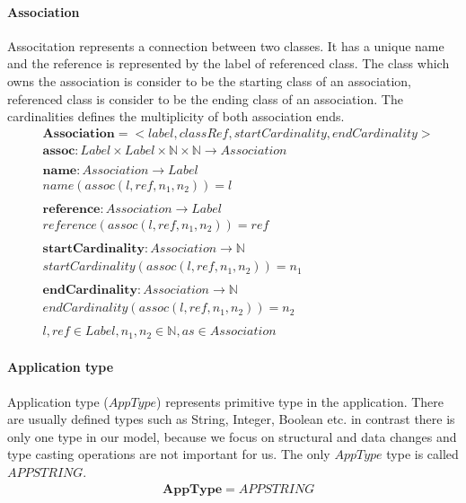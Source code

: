 \documentclass[11pt]{article}
\begin{document}
\paragraph {Association} Associtation represents a connection between two classes. It has a unique name and the reference is represented by the label of referenced class. The class which owns the association is consider to be the starting class of an association, referenced class is consider to be the ending class of an association. The cardinalities defines the multiplicity of both association ends.
\begin{align*}
&	\mathbf{Association} = <label, classRef, startCardinality, endCardinality> \\
&	\mathbf{assoc} : Label \times Label \times \mathbb{N} \times \mathbb{N} \rightarrow Association\\ \\
&	\mathbf{name} : Association \rightarrow Label \\
&	name(assoc(l, ref, n_1, n_2)) = l\\ \\
&	\mathbf{reference} : Association \rightarrow Label \\
&	reference(assoc(l, ref, n_1, n_2)) = ref\\ \\
&	\mathbf{startCardinality} : Association \rightarrow \mathbb{N} \\
&	startCardinality(assoc(l, ref, n_1, n_2)) = n_1\\ \\
&	\mathbf{endCardinality} : Association \rightarrow \mathbb{N} \\
&	endCardinality(assoc(l, ref, n_1, n_2)) = n_2 \\ \\
&	l, ref \in Label,  n_1, n_2 \in \mathbb{N}, as \in Association
\end{align*}



\paragraph{Application type} Application type ($AppType$) represents primitive type in the application. There are usually defined types such as String, Integer, Boolean etc. in contrast there is only one type in our model, because we focus on structural and data changes and type casting operations are not important for us. The only $AppType$ type is called $APPSTRING$.
\begin{align*}
& \mathbf{AppType} = APPSTRING
\end{align*}
\end{document}
